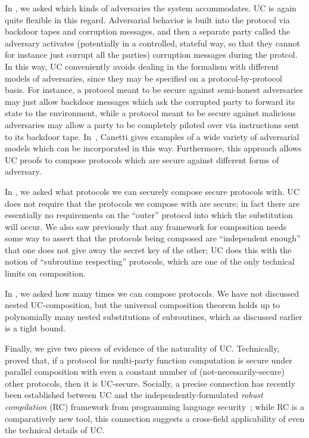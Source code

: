 In , we asked which kinds of adversaries the
system accommodates. UC is again quite flexible in this regard. Adversarial
behavior is built into the protocol via backdoor tapes and corruption messages,
and then a separate party called the adversary activates (potentially in a
controlled, stateful way, so that they cannot for instance just corrupt all the
parties) corruption messages during the protcol. In this way, UC conveniently
avoids dealing in the formalism with different models of adversaries, since they
may be specified on a protocol-by-protocol basis. For instance, a protocol meant
to be secure against semi-honest adversaries may just allow backdoor messages
which ask the corrupted party to forward its state to the environment, while a
protocol meant to be secure against malicious adversaries may allow a party to
be completely piloted over via instructions sent to its backdoor tape.
In~\cite[Section 7.1.1]{canetti-2000}, Canetti gives examples of a wide variety
of adversarial models which can be incorporated in this way. Furthermore, this
approach allows UC proofs to compose protocols which are secure against
different forms of adversary.

In , we asked what protocols we can securely
compose secure protocols with. UC does not require that the protocols we compose
with are secure; in fact there are essentially no requirements on the ``outer''
protocol into which the substitution will occur. We also saw previously that any
framework for composition needs some way to assert that the protocols being
composed are ``independent enough'' that one does not give away the secret key
of the other; UC does this with the notion of ``subroutine respecting''
protocols, which are one of the only technical limits on composition.

In , we asked how many times we can compose
protocols. We have not discussed nested UC-composition, but the universal
composition theorem holds up to polynomially many nested substitutions of
subroutines, which as discussed earlier is a tight bound.

%
Finally, we give two pieces of evidence of the naturality of UC.
Technically,~\cite{lindell-2003} proved that, if a protocol for multi-party
function computation is secure under parallel composition with even a constant
number of (not-necessarily-secure) other protocols, then it is UC-secure.
Socially, a precise connection has recently been established between UC and the
independently-formulated \emph{robust compilation} (RC) framework from
programming language security~\cite{patrignani-2022}; while RC is a
comparatively new tool, this connection suggests a cross-field applicability of
even the technical details of UC.

